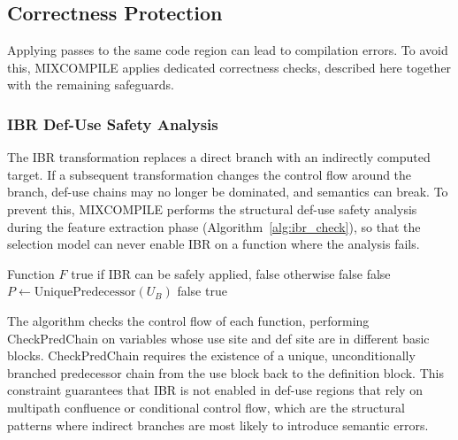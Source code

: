 \documentclass[pdflatex,sn-mathphys-num]{sn-jnl}
\theoremstyle{thmstyleone}%
\theoremstyle{thmstyletwo}%
\theoremstyle{thmstylethree}%
\begin{document}
\subsection{Correctness Protection}

Applying passes to the same code region can lead to compilation errors. To avoid
this, MIXCOMPILE applies dedicated correctness checks, described here together with
the remaining safeguards.

\subsubsection{IBR Def-Use Safety Analysis}

The IBR transformation replaces a direct branch with an indirectly computed target.
If a subsequent transformation changes the control flow around the branch, def-use
chains may no longer be dominated, and semantics can break. To prevent this, MIXCOMPILE
performs the structural def-use safety analysis during the feature extraction phase
(Algorithm~\ref{alg:ibr_check}), so that the selection model can never enable IBR on a
function where the analysis fails.

\begin{algorithm}[!t]
\footnotesize
\caption{IBR Compatibility Check (CheckIBRCompatibility)}
\label{alg:ibr_check}
\begin{algorithmic}[1]
    \Require Function $F$
    \Ensure true if IBR can be safely applied, false otherwise
                    \Return false
                \EndIf
                     \Return false \EndIf
                    \State $P \gets \text{UniquePredecessor}(U_B)$
                     \Return false \EndIf
                \EndIf
            \EndFor
        \EndFor
    \EndFor
    \Return true
\end{algorithmic}
\end{algorithm}

The algorithm checks the control flow of each function, performing CheckPredChain on
variables whose use site and def site are in different basic blocks. CheckPredChain
requires the existence of a unique, unconditionally branched predecessor chain from
the use block back to the definition block. This constraint guarantees that IBR is not
enabled in def-use regions that rely on multipath confluence or conditional control
flow, which are the structural patterns where indirect branches are most likely to
introduce semantic errors.
\end{document}
